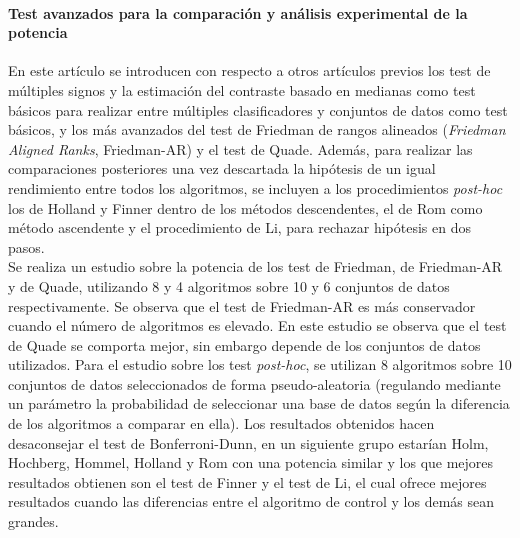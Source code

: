 	\paragraph{Test avanzados para la comparación y análisis 
experimental de la potencia} \cite{GARCIA10} En este
artículo se introducen con respecto a otros artículos 
previos los test de múltiples signos y la estimación del 
contraste basado en medianas como test básicos para realizar
entre múltiples clasificadores y conjuntos de datos como 
test básicos, y los más avanzados del test de Friedman
de rangos alineados (\textit{Friedman Aligned Ranks}, 
Friedman-AR) y el test de Quade. Además, para realizar las 
comparaciones  posteriores  una vez descartada la hipótesis 
de un igual  rendimiento entre todos los algoritmos, se 
incluyen a los  procedimientos \textit{post-hoc} los de 
Holland y Finner  dentro de  los métodos descendentes, el de 
Rom como método  ascendente y el procedimiento de Li, para 
rechazar hipótesis en dos pasos.\\
	Se realiza un estudio sobre la potencia de los test
de Friedman, de Friedman-AR y de Quade, utilizando 8 y 4
algoritmos sobre 10 y 6 conjuntos de datos respectivamente. 
Se observa que el test de Friedman-AR es más conservador
cuando el número de algoritmos es elevado. En este estudio
se observa que el test de Quade se comporta mejor, sin
embargo depende de los conjuntos de datos utilizados. Para
el estudio sobre los test \textit{post-hoc}, se utilizan
8 algoritmos sobre 10 conjuntos de datos seleccionados
de forma pseudo-aleatoria (regulando mediante un parámetro la 
probabilidad de seleccionar una base de datos según la 
diferencia de los algoritmos a comparar en ella). Los 
resultados obtenidos hacen desaconsejar el test de 
Bonferroni-Dunn, en un siguiente grupo estarían Holm, 
Hochberg, Hommel, Holland y Rom con una potencia similar
y los que mejores resultados obtienen son el test de Finner
y el test de Li, el cual ofrece mejores resultados 
cuando las diferencias entre el algoritmo de control y los 
demás sean grandes.

	
